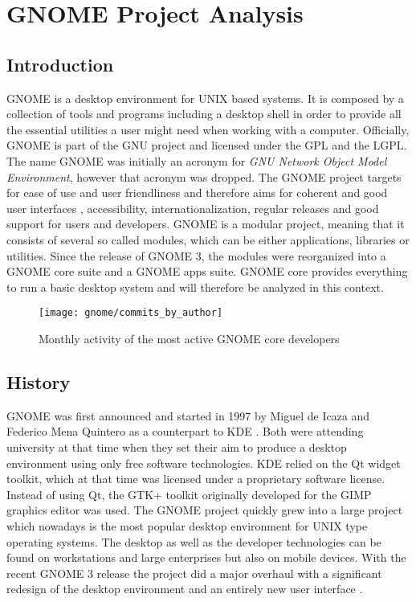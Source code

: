 \section{GNOME Project Analysis} %
\label{sec:GNOME Project Analysis}


\subsection{Introduction} %
\label{sub:Introduction}

GNOME is a desktop environment for UNIX based systems. It is composed by a
collection of tools and programs including a desktop shell in order to provide
all the essential utilities a user might need when working with a computer.
Officially, GNOME is part of the GNU project and licensed under the \ac{GPL}
and the \ac{LGPL}. The name GNOME was initially an acronym for \emph{GNU
Network Object Model Environment}, however that acronym was dropped. The GNOME
project targets for ease of use and user friendliness and therefore aims for
coherent and good user interfaces \cite{GNOMEHIG}, accessibility,
internationalization, regular releases and good support for users and
developers. GNOME is a modular project, meaning that it consists of several so
called modules, which can be either applications, libraries or utilities. Since
the release of GNOME 3, the modules were reorganized into a GNOME core suite
and a GNOME apps suite. GNOME core provides everything to run a basic desktop
system and will therefore be analyzed in this context.

\begin{figure}[htbp]
  \centering
  \texttt{[image: gnome/commits\_by\_author]}
  \caption{Monthly activity of the most active GNOME core developers}
\end{figure}


\subsection{History} %
\label{sub:History}

GNOME was first announced and started in 1997 by Miguel de Icaza and Federico
Mena Quintero as a counterpart to KDE
\cite{German2003,GNOMEAbout,GNOMEAnnouncement}. Both were attending university
at that time when they set their aim to produce a desktop environment using
only free software technologies. KDE relied on the Qt widget toolkit, which at
that time was licensed under a proprietary software license. Instead of using
Qt, the GTK+ toolkit originally developed for the GIMP graphics editor was
used. The GNOME project quickly grew into a large project which nowadays is the
most popular desktop environment for UNIX type operating systems. The desktop
as well as the developer technologies can be found on workstations and large
enterprises but also on mobile devices. With the recent GNOME 3 release the
project did a major overhaul with a significant redesign of the desktop
environment and an entirely new user interface \cite{GNOMEPress}.

